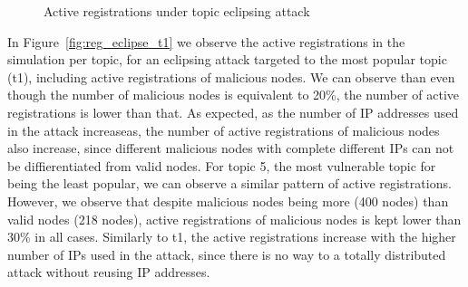 \begin{figure}[!h]
\centering
{} 
\hspace{-0.15cm}
 \caption{Active registrations under topic eclipsing attack} 
\label{fig:reg_eclipse}
\vspace{-0.15in}
\end{figure}   

In Figure~\ref{fig:reg_eclipse_t1} we observe the active registrations in the simulation per topic, for an eclipsing attack targeted to the most popular topic (t1), including active registrations of malicious nodes.
We can observe than even though the number of malicious nodes is equivalent to 20\%, the number of active registrations is lower than that. 
As expected, as the number of IP addresses used in the attack increaseas, the number of active registrations of malicious nodes also increase, since different malicious nodes with complete different IPs can not be diffierentiated from valid nodes.
For topic 5, the most vulnerable topic for being the least popular, we can observe a similar pattern of active registrations. 
However, we observe that despite malicious nodes being more (400 nodes) than valid nodes (218 nodes), active registrations of malicious nodes is kept lower than 30\% in all cases. Similarly to t1, the active registrations increase with the higher number of IPs used in the attack, since there is no way to a totally distributed attack without reusing IP addresses.



